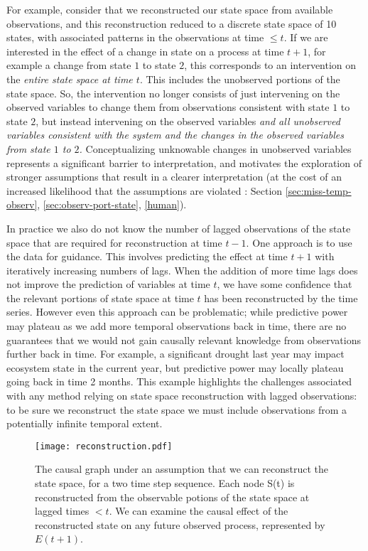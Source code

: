 \documentclass[12pt]{article}
\begin{document}
For example, consider that we reconstructed our state space from
available observations, and this reconstruction reduced to a discrete
state space of 10 states, with associated patterns in the observations
at time $\leq t$. If we are interested in the effect of a change in
state on a process at time $t+1$, for example a change from state $1$
to state $2$, this corresponds to an intervention on the
\textit{entire state space at time $t$}. This includes the unobserved
portions of the state space. So, the intervention no longer consists
of just intervening on the observed variables to change them from
observations consistent with state $1$ to state $2$, but instead
intervening on the observed variables \emph{and all unobserved
  variables consistent with the system and the changes in the observed
  variables from state $1$ to $2$.}  Conceptualizing unknowable
changes in unobserved variables represents a significant barrier to
interpretation, and motivates the exploration of stronger assumptions
that result in a clearer interpretation (at the cost of an increased
likelihood that the assumptions are violated : Section
\ref{sec:miss-temp-observ}, \ref{sec:observ-port-state}, \ref{human}).

In practice we also do not know the number of lagged observations of
the state space that are required for reconstruction at time
$t-1$. One approach is to use the data for guidance. This involves
predicting the effect at time $t+1$ with iteratively increasing
numbers of lags. When the addition of more time lags does not improve
the prediction of variables at time $t$, we have some confidence that
the relevant portions of state space at time $t$ has been
reconstructed by the time series. However even this approach can be
problematic; while predictive power may plateau as we add more
temporal observations back in time, there are no guarantees that we
would not gain causally relevant knowledge from observations further
back in time. For example, a significant drought last year may impact
ecosystem state in the current year, but predictive power may locally
plateau going back in time 2 months. This example highlights the
challenges associated with any method relying on state space
reconstruction with lagged observations: to be sure we reconstruct the
state space we must include observations from a potentially infinite
temporal extent.

\begin{figure}
  \texttt{[image: reconstruction.pdf]}
  \caption{The causal graph under an assumption that we can
    reconstruct the state space, for a two time step sequence. Each
    node S(t) is reconstructed from the observable potions of the
    state space at lagged times $< t$. We can examine the causal
    effect of the reconstructed state on any future observed process,
    represented by $E(t+1)$.}
  \label{fig:reconstructed}
\end{figure}
\end{document}
